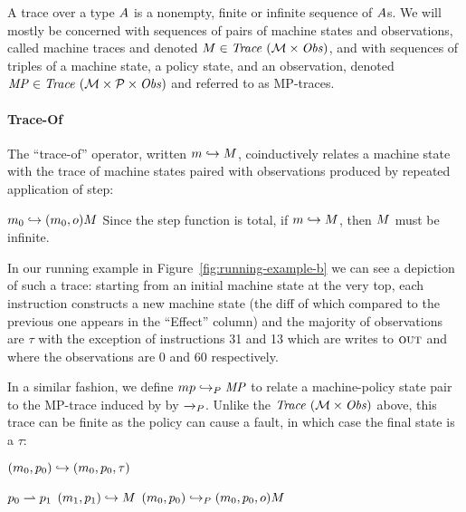 \documentclass[acmsmall,review,anonymous]{acmart}\settopmatter{printfolios=true,printccs=false,printacmref=false}
\begin{document}
A trace over a type $A$ is a nonempty, finite or infinite sequence of
$A$s. We will mostly be concerned with sequences of pairs of machine states
and observations, called machine traces and denoted $M \in \mathit{Trace}~({\mathcal M} \times \mathit{Obs})$,
and with sequences of triples of a machine state, a policy state, and an
observation, denoted $\mathit{MP} \in \mathit{Trace}~({\mathcal M} \times \mathcal{P} \times \mathit{Obs})$ and referred to as MP-traces. 


\paragraph*{Trace-Of}

The ``trace-of'' operator, written \(m \hookrightarrow M\),
coinductively relates a machine state with the trace of machine states
paired with observations produced by repeated application of step:

            {\(m_0 \hookrightarrow (m_0,o) M\)}%
%
\noindent
Since the step function is total, if \(m \hookrightarrow M\),
then \(M\) must be infinite.

In our running example in Figure~\cref{fig:running-example-b} we can
see a depiction of such a trace: starting from an initial machine
state at the very top, each instruction constructs a new machine state
(the diff of which compared to the previous one appears in the
``Effect'' column) and the majority of observations are $\tau$ with
the exception of instructions 31 and 13 which are writes to $\textsc{out}$
and where the observations are $0$ and $60$ respectively.

In a similar fashion, we define \(mp \hookrightarrow_P \mathit{MP}\)
to relate a machine-policy state pair to the MP-trace
induced by by \(\xrightarrow{}_P\). Unlike the $\mathit{Trace}~({\mathcal M} \times \mathit{Obs})$ above, this trace can
be finite as the policy can cause a fault, in which case the final state is
a \(\tau\):

\begin{minipage}{.4\textwidth}
         {\((m_0,p_0) \hookrightarrow (m_0,p_0,\tau)\)}
\end{minipage}
\begin{minipage}{.55\textwidth}
              {\(p_0 \rightharpoonup p_1\)}
              {\((m_1,p_1) \hookrightarrow M\)}
              {\((m_0,p_0) \hookrightarrow_P (m_0,p_0,o) M\)}
\end{minipage}
\end{document}
